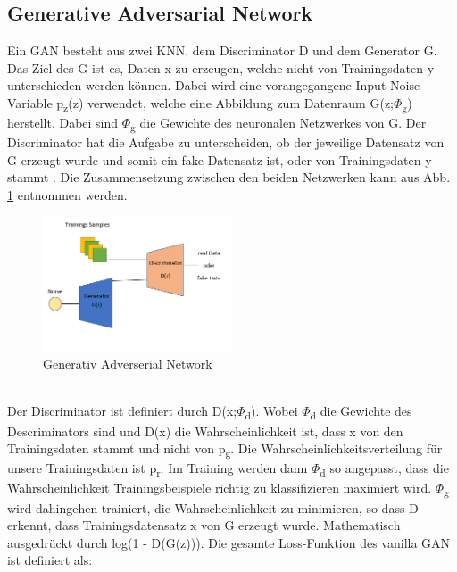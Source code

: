 \documentclass{llncs}
\begin{document}
\subsection{Generative Adversarial Network}

Ein GAN besteht aus zwei KNN, dem Discriminator D und dem Generator G. Das Ziel des G ist es, Daten x zu erzeugen, welche nicht von Trainingsdaten y unterschieden werden können. Dabei wird eine vorangegangene Input Noise Variable p\textsubscript{z}(z) verwendet, welche eine Abbildung zum Datenraum G(z;$\Phi$\textsubscript{g}) herstellt. Dabei sind $\Phi$\textsubscript{g} die Gewichte des neuronalen Netzwerkes von G. Der Discriminator hat die Aufgabe zu unterscheiden, ob der jeweilige Datensatz von G erzeugt wurde und somit ein fake Datensatz ist, oder von Trainingsdaten y stammt \cite{goodfellow2014}. Die Zusammensetzung zwischen den beiden Netzwerken kann aus Abb. \ref{fig:Bild20} entnommen werden.
\\
\begin{figure}[htbp] 
	\centering
	\includegraphics[width=0.5\textwidth]{GAN_GRUNDAUFBAU.png}
	\caption{Generativ Adverserial Network}
	\label{fig:Bild20}
\end{figure}
\\
Der Discriminator ist definiert durch D(x;$\Phi$\textsubscript{d}). Wobei $\Phi$\textsubscript{d} die Gewichte des Descriminators sind und D(x) die Wahrscheinlichkeit ist, dass x von den Trainingsdaten stammt und nicht von p\textsubscript{g}. Die Wahrscheinlichkeitsverteilung für unsere Trainingsdaten ist p\textsubscript{r}.  Im Training werden dann $\Phi$\textsubscript{d} so angepasst, dass die Wahrscheinlichkeit Trainingsbeispiele richtig zu klassifizieren maximiert wird. $\Phi$\textsubscript{g} wird dahingehen trainiert, die Wahrscheinlichkeit zu minimieren, so dass D erkennt, dass Trainingsdatensatz x von G erzeugt wurde. Mathematisch ausgedrückt durch log(1 - D(G(z))). Die gesamte Loss-Funktion des vanilla GAN ist definiert als:
\\\\
\end{document}

